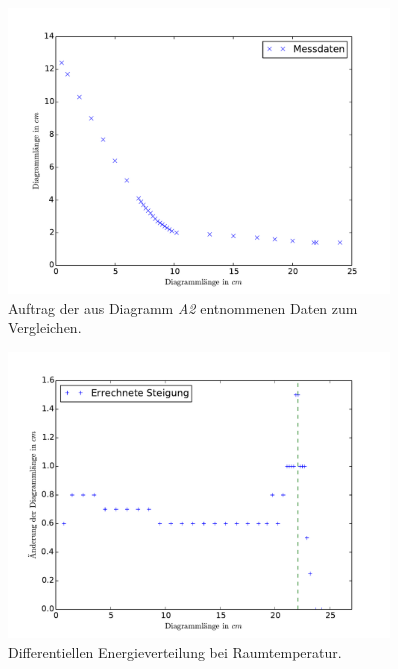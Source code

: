 \begin{figure}[p]
	\centering
	\includegraphics[width=0.9\textwidth]{Bilder/Vert_warm.pdf}
	\caption{Auftrag der aus Diagramm \emph{A2} entnommenen Daten zum Vergleichen.\cite{matplotlib}}
	\label{fig:E_vert_warm}
\end{figure}\begin{figure}[p]
	\centering
	\includegraphics[width=0.9\textwidth]{Bilder/Vert_kalt_diff.pdf}
	\caption{Differentiellen Energieverteilung bei Raumtemperatur.\cite{matplotlib}}
	\label{fig:E_vert_kalt}
\end{figure}

